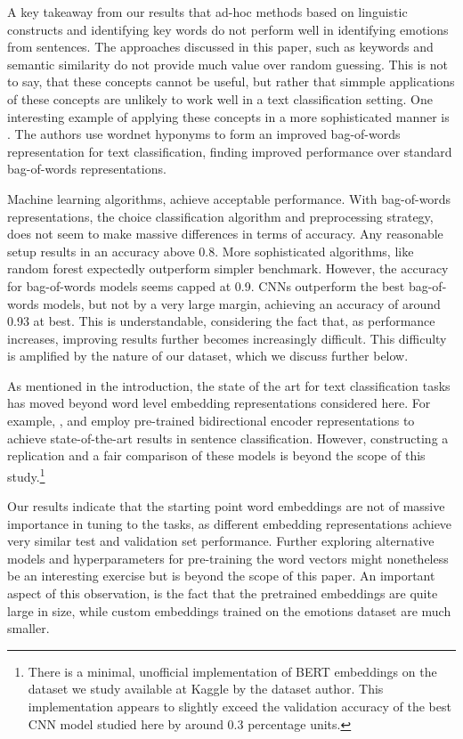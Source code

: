 \documentclass[conference]{IEEEtran}
\begin{document}
A key takeaway from our results that ad-hoc methods based on linguistic constructs and identifying key words do not perform well in identifying emotions from sentences. The approaches discussed in this paper, such as keywords and semantic similarity do not provide much value over random guessing. This is not to say, that these concepts cannot be useful, but rather that simmple applications of these concepts are unlikely to work well in a text classification setting. One interesting example of applying these concepts in a more sophisticated manner is \cite{scott-matwin-1998-text}. The authors use wordnet hyponyms to form an improved bag-of-words representation for text classification, finding improved performance over standard bag-of-words representations.

Machine learning algorithms, achieve acceptable performance. With bag-of-words representations, the choice classification algorithm and preprocessing strategy, does not seem to make massive differences in terms of accuracy. Any reasonable setup results in an accuracy above 0.8. More sophisticated algorithms, like random forest expectedly outperform simpler benchmark. However, the accuracy for bag-of-words models seems capped at 0.9. CNNs outperform the best bag-of-words models, but not by a very large margin,  achieving an accuracy of around 0.93 at best. This is understandable, considering the fact that, as performance increases, improving results further becomes increasingly difficult. This difficulty is amplified by the nature of our dataset, which we discuss further below.

As mentioned in the introduction, the state of the art for text classification tasks has moved beyond word level embedding representations considered here. For example, \cite{bert}, \cite{xlnet} and \cite{bertclassification} employ pre-trained bidirectional encoder representations to achieve state-of-the-art results in sentence classification. However, constructing a replication and a fair comparison of these models is beyond the scope of this study.\footnote{There is a minimal, unofficial implementation of BERT\cite{bert} embeddings on the dataset we study\cite{kaggledata} available at Kaggle by the dataset author. This implementation appears to slightly exceed the validation accuracy of the best CNN model studied here by around 0.3 percentage units.}

Our results indicate that the starting point word embeddings are not of massive importance in tuning to the tasks, as different embedding representations achieve very similar test and validation set performance. Further exploring alternative models and hyperparameters for pre-training the word vectors might nonetheless be an interesting exercise but is beyond the scope of this paper. An important aspect of this observation, is the fact that the pretrained embeddings are quite large in size, while custom embeddings trained on the emotions dataset are much smaller.
\end{document}
